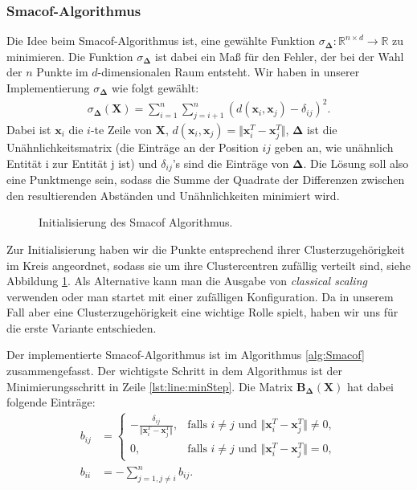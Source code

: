 \subsubsection{Smacof-Algorithmus}
Die Idee beim Smacof-Algorithmus ist, eine gewählte Funktion $\sigma_\mathbf{\Delta}:\mathbb{R}^{n\times d} \rightarrow \mathbb{R}$ zu mi\-ni\-mie\-ren. Die
Funktion $\sigma_\mathbf{\Delta}$ ist dabei ein Maß für den Fehler, der bei der Wahl der $n$ Punkte im $d$-dimensionalen Raum entsteht. Wir haben
in unserer Implementierung $\sigma_\mathbf{\Delta}$ wie folgt gewählt:
\begin{align*}
 \sigma_\mathbf{\Delta}(\mathbf{X}) = \sum_{i=1}^n \sum_{j=i+1}^n (d(\mathbf{x}_i, \mathbf{x}_j) - \delta_{ij})^2.
\end{align*}
Dabei ist $\mathbf{x}_i$ die $i$-te Zeile von $\mathbf{X}$, $d(\mathbf{x}_i, \mathbf{x}_j) = \Vert \mathbf{x}_i^T - \mathbf{x}_j^T  \Vert$,
$\mathbf{\Delta}$ ist die Unähnlichkeitsmatrix (die Einträge an der Position $ij$ geben an, wie unähnlich Entität i zur Entität j ist) und $\delta_{ij}$'s sind die Einträge von $\mathbf{\Delta}$. Die Lösung soll also eine 
Punktmenge sein, sodass die Summe der Quadrate der Differenzen zwischen den resultierenden Abständen und Unähnlichkeiten minimiert wird.

\begin{figure}[ht]
   \centering
   
   \caption[Initialisierung des Smacof-Algorithmus]{Initialisierung des Smacof Algorithmus.}\label{img:SmacofInitialisierung}
\end{figure}

Zur Initialisierung haben wir die Punkte entsprechend ihrer Clusterzugehörigkeit im Kreis angeordnet, sodass sie um ihre 
Clustercentren zufällig verteilt sind, siehe Abbildung \ref{img:SmacofInitialisierung}. Als Alternative kann man die 
Ausgabe von \textit{classical scaling} verwenden oder man startet mit einer zufälligen Konfiguration. Da in unserem Fall aber eine 
Clusterzugehörigkeit eine wichtige Rolle spielt, haben wir uns für die erste Variante entschieden.





Der implementierte Smacof-Algorithmus ist im Algorithmus \ref{alg:Smacof} zusammengefasst. Der wichtigste
Schritt in dem Algorithmus ist der Minimierungsschritt in Zeile \ref{lst:line:minStep}. Die Matrix $\mathbf{B}_\mathbf{\Delta}(\mathbf{X})$
hat dabei folgende Einträge:
\begin{align*}
  b_{ij} &= \begin{cases}
            -\frac{\delta_{ij}}{\Vert \mathbf{x}_i^T - \mathbf{x}_j^T  \Vert}, &\text{falls } i\not=j \text{ und } \Vert \mathbf{x}_i^T - \mathbf{x}_j^T  \Vert \not=0, \\
            0,                                                             &\text{falls } i\not=j \text{ und } \Vert \mathbf{x}_i^T - \mathbf{x}_j^T  \Vert =0, 
           \end{cases}\\
  b_{ii} &= -\sum_{j=1, j\not=i}^n b_{ij}.
\end{align*}

